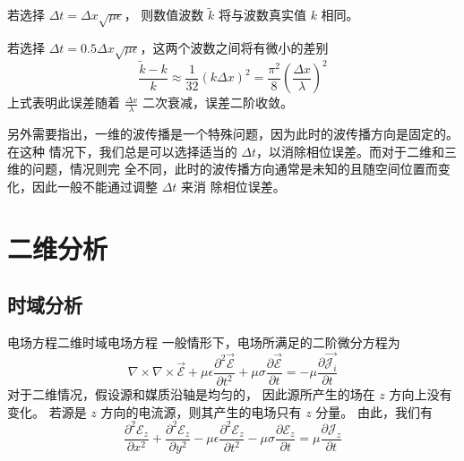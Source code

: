 \begin{example}
    若选择 $\Delta t = \Delta x \sqrt{\mu \epsilon}$，
    则数值波数 $\tilde{k}$ 将与波数真实值 $k$ 相同。
\end{example}

\begin{example}
    若选择 $\Delta t = 0.5 \Delta x \sqrt{\mu \epsilon}$，这两个波数之间将有微小的差别
    \begin{equation*}
        \frac{\tilde{k}-k}{k}
        \approx\frac{1}{32}(k \Delta x)^2
        =\frac{\pi^2}{8}\left(\frac{\Delta x}{\lambda}\right)^2
    \end{equation*}
    上式表明此误差随着 $\frac{\Delta x}{\lambda}$ 二次衰减，误差二阶收敛。
\end{example}

\begin{note}
    另外需要指出，一维的波传播是一个特殊问题，因为此时的波传播方向是固定的。在这种
情况下，我们总是可以选择适当的 $\Delta t$，以消除相位误差。而对于二维和三维的问题，情况则完
全不同，此时的波传播方向通常是未知的且随空间位置而变化，因此一般不能通过调整 $\Delta t$ 来消
除相位误差。
\end{note}

\section{二维分析}

\subsection{时域分析}

\begin{theorem}{电场方程}{二维时域电场方程}
    一般情形下，电场所满足的二阶微分方程为
    \begin{equation}
        \nabla \times \nabla \times \vec{\mathscr{E}}
        +\mu \epsilon \frac{\partial^2 \vec{\mathscr{E}}}{\partial t^2}
        +\mu \sigma \frac{\partial \vec{\mathscr{E}}}{\partial t}
        =-\mu \frac{\partial \vec{\mathscr{J}_i}}{\partial t}
    \end{equation}
    对于二维情况，假设源和媒质沿轴是均匀的，
    因此源所产生的场在 $z$ 方向上没有变化。
    若源是 $z$ 方向的电流源，则其产生的电场只有 $z$ 分量。
    由此，我们有
    \begin{equation}
        \frac{\partial^2 \mathscr{E}_z}{\partial x^2}
        +\frac{\partial^2 \mathscr{E}_z}{\partial y^2}
        -\mu \epsilon \frac{\partial^2 \mathscr{E}_z}{\partial t^2}
        -\mu \sigma \frac{\partial \mathscr{E}_z}{\partial t}
        =\mu \frac{\partial \mathscr{J}_z}{\partial t}
        \label{二维电场方程}
    \end{equation}
\end{theorem}

